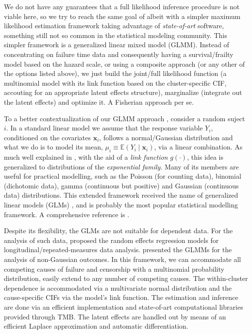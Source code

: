 We do not have any guarantees that a full likelihood inference procedure
is not viable here, so we try to reach the same goal of
 albeit with a simpler maximum likelihood estimation
framework taking advantage of \textit{state-of-art} software, something
still not so common in the statistical modeling community. This simpler
framework is a generalized linear mixed model (GLMM). Instead of
concentrating on failure time data and consequently having a
survival/frailty model based on the hazard scale, or using a composite
approach (or any other of the options listed above), we just build the
joint/full likelihood function (a multinomial model with its link
function based on the cluster-specific CIF, accouting for an appropriate
latent effects structure), marginalize (integrate out the latent
effects) and optimize it. A Fisherian approach per se.

To a better contextualization of our GLMM approach \cite{GLMM}, consider
a random suject \(i\). In a standard linear model we assume that the
response variable \(Y_{i}\), conditioned on the covariates
\(\bm{x}_{i}\), follows a normal/Gaussian distribution and what we do is
to model its mean, \(\mu_{i} \equiv \mathbb{E}(Y_{i} \mid \bm{x}_{i})\),
via a linear combination. As much well explained in ,
with the aid of a \textit{link function} \(g(\cdot)\), this idea is
generalized to distributions of the \textit{exponential family}. Many of
its members are useful for practical modelling, such as the Poisson (for
counting data), binomial (dichotomic data), gamma (continuous but
positive) and Gaussian (continuous data) distributions. This extended
framework received the name of generalized linear models
(GLMs) \cite{GLM72}, and is probably the most popular statistical
modelling framework. A comprehensive reference is .

 Despite its flexibility, the GLMs are not suitable for dependent
data. For the analysis of such data,  proposed the
random effects regression models for longitudinal/repeated-measures data
analysis.  presented the GLMMs for the analysis of
non-Gaussian outcomes. In this framework, we can accommodate all
competing causes of failure and censorship with a multinomial
probability distribution, easily extend to any number of competing
causes. The within-cluster dependence is accommodated via a multivariate
normal distribution and the cause-specific CIFs via the model's link
function. The estimation and inference are done via an efficient
implementation and state-of-art computational libraries provided through
TMB. The latent effects are handled out by means of an efficient Laplace
approximation and automatic differentiation.


